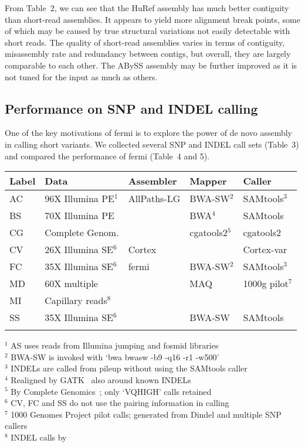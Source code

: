 \documentclass{bioinfo}
\begin{document}
From Table~2, we can see that the HuRef assembly has much better contiguity
than short-read assemblies. It appears to yield more alignment break points, some
of which may be caused by true structural variations not easily detectable with
short reads. The quality of short-read assemblies varies in terms of contiguity,
misassembly rate and redundancy between contigs, but overall, they are largely
comparable to each other. The ABySS assembly may be further improved as it
is not tuned for the input as much as others.

\subsection{Performance on SNP and INDEL calling}

One of the key motivations of fermi is to explore the power of de novo assembly
in calling short variants. We collected several SNP and INDEL call sets (Table~3)
and compared the performance of fermi (Table~4 and 5).

\begin{table}[t]
{\begin{tabular}{lllll}
\toprule
Label & Data & Assembler & Mapper & Caller \\
\midrule
AC & 96X Illumina PE$^1$ & AllPaths-LG & BWA-SW$^2$ & SAMtools$^3$ \\
BS & 70X Illumina PE & & BWA$^4$ & SAMtools \\
CG & Complete Genom.& & cgatools2$^5$ & cgatools2 \\
CV & 26X Illumina SE$^6$ & Cortex & & Cortex-var \\
FC & 35X Illumina SE$^6$ & fermi & BWA-SW$^2$ & SAMtools$^3$ \\
MD & 60X multiple        & & MAQ & 1000g pilot$^7$ \\
MI & Capillary reads$^8$     & &     & \\
SS & 35X Illumina SE$^6$ & & BWA-SW & SAMtools \\
\botrule
\end{tabular}}{
$^1$ AS uses reads from Illumina jumping and fosmid libraries\\
$^2$ BWA-SW is invoked with `bwa bwasw -b9 -q16 -r1 -w500'\\
$^3$ INDELs are called from pileup without using the SAMtools caller\\
$^4$ Realigned by GATK~\citep{Depristo:2011vn} also around known INDELs\\
$^5$ By Complete Genomics~\citep{Drmanac:2010ly}; only `VQHIGH' calls retained\\
$^6$ CV, FC and SS do not use the pairing information in calling\\
$^7$ 1000 Genomes Project pilot calls; generated from Dindel and multiple SNP callers\\
$^8$ INDEL calls by \citet{Mills:2011fk}\\
}
\end{table}
\end{document}
